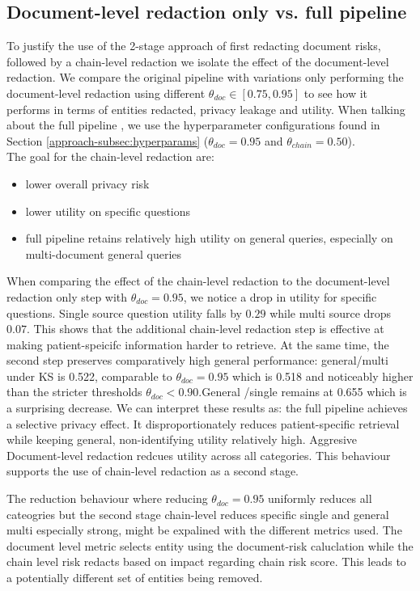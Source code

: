 \subsection{Document-level redaction only vs. full pipeline}
To justify the use of the 2-stage approach of first redacting document risks, followed by a chain-level redaction we isolate the effect of the document-level redaction. We compare the original pipeline with variations only performing the document-level redaction using different $\theta_{doc}\in[0.75, 0.95]$ to see how it performs in terms of entities redacted, privacy leakage and utility. When talking about the full pipeline , we use the hyperparameter configurations found in Section \ref{approach-subsec:hyperparams} ($\theta_{doc}=0.95$ and $\theta_{chain}=0.50$).\\
The goal for the chain-level redaction are:
\begin{itemize}
    \item lower overall privacy risk
    \item lower utility on specific questions 
    \item full pipeline retains relatively high utility on general queries, especially on multi-document general queries
\end{itemize}
When comparing the effect of the chain-level redaction to the document-level redaction only step with $\theta_{doc} = 0.95$, we notice a drop in utility for specific questions. Single source question utility falls by $0.29$ while multi source drops $0.07$. This shows that the additional chain-level redaction step is effective at making patient-speicifc information harder to retrieve. At the same time, the second step preserves comparatively high general performance: general/multi under KS is 0.522, comparable to $\theta_{doc} = 0.95$ which is 0.518 and noticeably higher than the stricter thresholds $\theta_{doc} < 0.90$.General /single remains at 0.655 which is a surprising decrease. We can interpret these results as: the full pipeline achieves a selective privacy effect. It disproportionately reduces patient-specific retrieval while keeping general, non-identifying utility relatively high. Aggresive Document-level redaction redcues utility across all categories. This behaviour supports the use of chain-level redaction as a second stage.

The reduction behaviour where reducing  $\theta_{doc} = 0.95$ uniformly reduces all cateogries but the second stage chain-level reduces specific single and general multi especially strong, might be expalined with the different metrics used. The document level metric selects entity using the document-risk caluclation while the chain level risk redacts based on impact regarding chain risk score. This leads to a potentially different set of entities being removed. 



